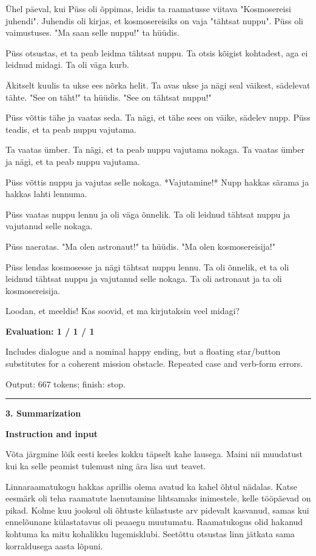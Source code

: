 \documentclass[10pt]{article}
\begin{document}
{\begin{minipage}{\textwidth}
\par\smallskip
Ühel päeval, kui Püss oli õppimas, leidis ta raamatusse viitava "Kosmosereisi juhendi". Juhendis oli kirjas, et kosmosereisiks on vaja "tähtsat nuppu". Püss oli vaimustuses. "Ma saan selle nuppu!" ta hüüdis.
\par\smallskip
Püss otsustas, et ta peab leidma tähtsat nuppu. Ta otsis kõigist kohtadest, aga ei leidnud midagi. Ta oli väga kurb.
\par\smallskip
Äkitselt kuulis ta ukse ees nõrka helit. Ta avas ukse ja nägi seal väikest, sädelevat tähte. "See on täht!" ta hüüdis. "See on tähtsat nuppu!"
\par\smallskip
Püss võttis tähe ja vaatas seda. Ta nägi, et tähe sees on väike, sädelev nupp. Püss teadis, et ta peab nuppu vajutama.
\par\smallskip
Ta vaatas ümber. Ta nägi, et ta peab nuppu vajutama nokaga. Ta vaatas ümber ja nägi, et ta peab nuppu vajutama.
\par\smallskip
Püss võttis nuppu ja vajutas selle nokaga. *Vajutamine!* Nupp hakkas särama ja hakkas lahti lennuma.
\par\smallskip
Püss vaatas nuppu lennu ja oli väga õnnelik. Ta oli leidnud tähtsat nuppu ja vajutanud selle nokaga.
\par\smallskip
Püss naeratas. "Ma olen astronaut!" ta hüüdis. "Ma olen kosmosereisija!"
\par\smallskip
Püss lendas kosmosesse ja nägi tähtsat nuppu lennu. Ta oli õnnelik, et ta oli leidnud tähtsat nuppu ja vajutanud selle nokaga. Ta oli astronaut ja ta oli kosmosereisija.
\par\smallskip
Loodan, et meeldis! Kas soovid, et ma kirjutaksin veel midagi?\par\smallskip
\textbf{Evaluation: 1 / 1 / 1}\par Includes dialogue and a nominal happy ending, but a floating star/button substitutes for a coherent mission obstacle. Repeated case and verb-form errors.
\par {\color{gray} Output: 667 tokens; finish: stop.}\par
\medskip\hrule\smallskip
{\bfseries 3. Summarization}\par\smallskip
\textbf{Instruction and input}\par Võta järgmine lõik eesti keeles kokku täpselt kahe lausega. Maini nii muudatust kui ka selle peamist tulemust ning ära lisa uut teavet.
\par\smallskip
Linnaraamatukogu hakkas aprillis olema avatud ka kahel õhtul nädalas. Katse eesmärk oli teha raamatute laenutamine lihtsamaks inimestele, kelle tööpäevad on pikad. Kolme kuu jooksul oli õhtuste külastuste arv pidevalt kasvanud, samas kui ennelõunane külastatavus oli peaaegu muutumatu. Raamatukogus olid hakanud kohtuma ka mitu kohalikku lugemisklubi. Seetõttu otsustas linn jätkata sama korraldusega aasta lõpuni.\par\smallskip

\end{minipage}}
\end{document}
